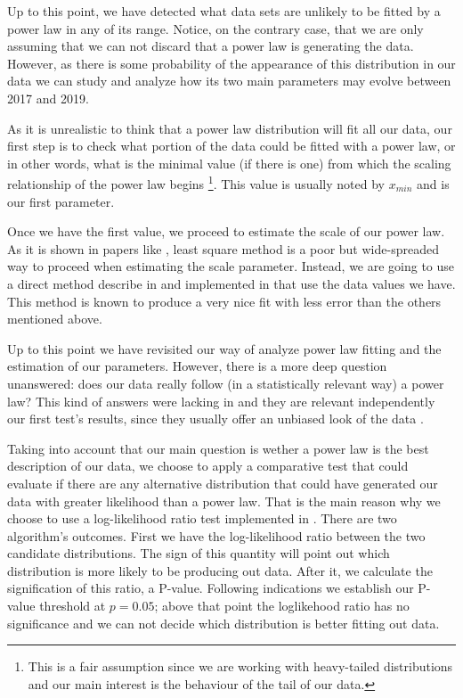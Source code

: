 \documentclass[conference]{IEEEtran}
\begin{document}
Up to this point, we have detected what data sets are unlikely to be
fitted by a power law in any of its range. Notice, on the contrary
case, that we are only assuming that we can not discard that a power
law is generating the data.  However, as there is some probability of
the appearance of this distribution in our data we can study and
analyze how its two main parameters may evolve between 2017 and 2019.

As it is unrealistic to think that a power law distribution will fit
all our data, our first step is to check what portion of the data
could be fitted with a power law, or in other words, what is the
minimal value (if there is one) from which the scaling relationship of
the power law begins \footnote{This is a fair assumption since we are
  working with heavy-tailed distributions and our main interest is the
  behaviour of the tail of our data.}.  This value is usually noted by
$x_{min}$ and is our first parameter.

Once we have the first value, we proceed to estimate the scale of our
power law.  As it is shown in papers like \cite{newman2005power,
  clauset2009power}, least square method is a poor but wide-spreaded
way to proceed when estimating the scale parameter. Instead, we are
going to use a direct method describe in \cite{clauset2009power} and
implemented in \cite{alstott2014powerlaw} that use the data values we
have. This method is known to produce a very nice fit with less error
than the others mentioned above.

Up to this point we have revisited our way of analyze power law
fitting and the estimation of our parameters. However, there is a more
deep question unanswered: does our data really follow (in a
statistically relevant way) a power law?  This kind of answers were
lacking in \cite{merelo2017self} and they are relevant independently
our first test's results, since they usually offer an unbiased look of
the data .

Taking into account that our main question is wether a power law is
the best description of our data, we choose to apply a comparative
test that could evaluate if there are any alternative distribution
that could have generated our data with greater likelihood than a
power law. That is the main reason why we choose to use a
log-likelihood ratio test implemented in \cite{alstott2014powerlaw}.
There are two algorithm's outcomes. First we have the log-likelihood
ratio between the two candidate distributions. The sign of this
quantity will point out which distribution is more likely to be
producing out data. After it, we calculate the signification of this
ratio, a P-value. Following \cite{alstott2014powerlaw} indications we
establish our P-value threshold at $p=0.05$; above that point the
loglikehood ratio has no significance and we can not decide which
distribution is better fitting out data.
\end{document}
